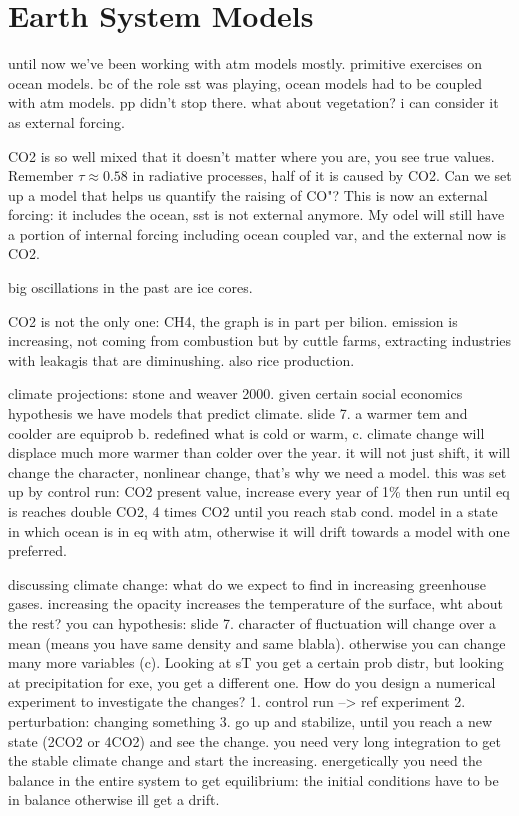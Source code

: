 
\chapter{Earth System Models}%

until now we've been working with atm models mostly. primitive exercises on ocean models. bc of the role sst was playing, ocean models had to be coupled with atm models. pp didn't stop there.
what about vegetation? i can consider it as external forcing.

CO2 is so well mixed that it doesn't matter where you are, you see true values. Remember $\tau\approx 0.58$ in radiative processes, half of it is caused by CO2.  Can we set up a model that helps us quantify the raising of CO"? This is now an external forcing: it includes the ocean, sst is not external anymore. My odel will still have a portion of internal forcing including ocean coupled var, and the external now is CO2.

big oscillations in the past are ice cores.

CO2 is not the only one: CH4, the graph is in part per bilion.  emission is increasing, not coming from combustion but by cuttle farms, extracting industries with leakagis that are diminushing. also rice production.

climate projections: stone and weaver 2000. given certain social economics hypothesis we have models that predict climate. slide 7. a warmer tem and coolder are equiprob b. redefined what is cold or warm, c. climate change will displace much more warmer than colder over the year. it will not just shift, it will change the character, nonlinear change, that's why we need a model.
this was set up by control run: CO2 present value, increase every year of 1\% then run until eq is reaches double CO2, 4 times CO2 until you reach stab cond. model in a state in which ocean is in eq with atm, otherwise it will drift towards a model with one preferred.

discussing climate change: what do we expect to find in increasing greenhouse gases. increasing the opacity increases the temperature of the surface, wht about the rest?
you can hypothesis: slide 7. character of fluctuation will change over a mean (means you have same density and same blabla). otherwise you can change many more variables (c). Looking at sT you get a certain prob distr, but looking at precipitation for exe, you get a different one.
How do you design a numerical experiment to investigate the changes?
1. control run --> ref experiment
2. perturbation: changing something
3. go up and stabilize, until you reach a new state (2CO2 or 4CO2) and see the change.
you need very long integration to get the stable climate change and start the increasing.
energetically you need the balance  in the entire system to get equilibrium: the initial conditions have to be in balance otherwise ill get a drift.


